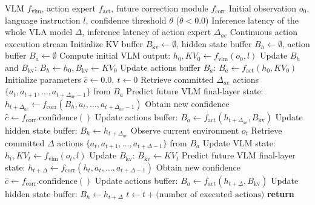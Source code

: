 \begin{algorithm}[]
\caption{Confidence-based Scheduling Optimization for Asynchronous VLA Inference}
\label{alg:scheduling}
\begin{algorithmic}[1]
\Require VLM $f_{\text{vlm}}$, action expert $f_{\text{act}}$, future correction module $f_{\text{corr}}$
\Require Initial observation $o_0$, language instruction $l$, confidence threshold $\theta$ ($\theta < 0.0$)
\Require Inference latency of the whole VLA model $\Delta$, inference latency of action expert $\Delta_{ae}$
\Ensure Continuous action execution stream
\State Initialize KV buffer $B_{\text{kv}} \leftarrow \emptyset$, hidden state buffer $B_h \leftarrow \emptyset$, action buffer $B_a \leftarrow \emptyset$
\State Compute initial VLM output: $h_0, KV_0 \leftarrow f_{\text{vlm}}(o_0, l)$
\State Update $B_h$ and $B_{\text{kv}}$: $B_h \leftarrow h_0, B_{\text{kv}} \leftarrow KV_0$
\State Update actions buffer $B_a$: $B_a \leftarrow f_{\text{act}}(h_{0},KV_0)$
\State Initialize parameters $\hat{c} \leftarrow 0.0,~t \leftarrow 0$ 
 
        \State Retrieve committed $\Delta_{ae}$ actions $\{a_t, a_{t+1}, \dots, a_{t+\Delta_{ae}-1}\}$ from $B_a$
        \State Predict future VLM final-layer state: $h_{t+\Delta_{ae}} \leftarrow f_{\text{corr}}(B_h, a_t, \dots, a_{t+\Delta_{ae}-1})$
        \State Obtain new confidence $\hat{c} \leftarrow f_{\text{corr}}.\text{confidence}()$
        \State Update actions buffer: $B_a \leftarrow f_{\text{act}}(h_{t+\Delta_{ae}},B_{\text{kv}})$
        \State Update hidden state buffer: $B_h \leftarrow h_{t+\Delta_{ae}}$
    \Else
        \State Observe current environment $o_t$
        \State Retrieve committed $\Delta$ actions $\{a_t, a_{t+1}, \dots, a_{t+\Delta-1}\}$ from $B_a$
        \State Update VLM state: $h_t, KV_t \leftarrow f_{\text{vlm}}(o_t, l)$  
        \State Update $B_{\text{kv}}$: $B_{\text{kv}} \leftarrow KV_t$
        \State Predict future VLM final-layer state: $h_{t+\Delta} \leftarrow f_{\text{corr}}(h_t, a_t, \dots, a_{t+\Delta-1})$
        \State Obtain new confidence $\hat{c} \leftarrow f_{\text{corr}}.\text{confidence}()$
        \State Update actions buffer: $B_a \leftarrow f_{\text{act}}(h_{t+\Delta},B_{\text{kv}})$
        \State Update hidden state buffer: $B_h \leftarrow h_{t+\Delta}$
    \EndIf
    \State $t \leftarrow t + \text{(number of executed actions)}$
\EndWhile
\State \textbf{return}
\end{algorithmic}
\end{algorithm}


